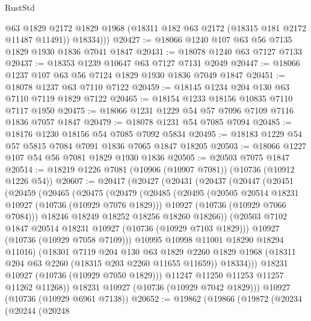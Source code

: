 \begin{lexlean}{RustStd}
\begin{coremodule}
          @63
          @1829
          @2172
          @1829
          @1968
          (@18311 @182 @63 @2172 (@18315 @181 @2172 @11487 @11491))
          @18334)))
@20427 := @18066 @1240 @107 @63 @56 @7135 @1829 @1930 @1836 @7041 @1847
@20431 := @18078 @1240 @63 @7127 @7133
@20437 := @18353 @1239 @10647 @63 @7127 @7131 @2049
@20447 := @18066 @1237 @107 @63 @56 @7124 @1829 @1930 @1836 @7049 @1847
@20451 := @18078 @1237 @63 @7110 @7122
@20459 := @18145 @1234 @204 @130 @63 @7110 @7119 @1829 @7122
@20465 := @18154 @1233 @18156 @10835 @7110 @7117 @1950
@20475 := @18066 @1231 @1229 @54 @57 @7096 @7109 @7116 @1836 @7057 @1847
@20479 := @18078 @1231 @54 @7085 @7094
@20485 := @18176 @1230 @18156 @54 @7085 @7092 @5834
@20495 := @18183 @1229 @54 @57 @5815 @7084 @7091 @1836 @7065 @1847 @18205
@20503 := @18066 @1227 @107 @54 @56 @7081 @1829 @1930 @1836
@20505 := @20503 @7075 @1847
@20514 := @18219 @1226 @7081 (@10906 (@10907 @7081)) (@10736 (@10912 @1226 @54))
@20607 := @20417
    (@20427
      (@20431
        (@20437
          (@20447
            (@20451
              (@20459
                (@20465
                  (@20475
                    (@20479
                      (@20485
                        (@20495
                          (@20505 @20514 @18231 @10927 (@10736 (@10929 @7076 @1829)))
                          @10927
                          (@10736 (@10929 @7066 @7084)))
                        @18246
                        @18249
                        @18252
                        @18256
                        @18260
                        @18266))
                    (@20503 @7102 @1847 @20514 @18231 @10927 (@10736 (@10929 @7103 @1829)))
                    @10927
                    (@10736 (@10929 @7058 @7109)))
                  @10995
                  @10998
                  @11001
                  @18290
                  @18294
                  @11016)
                (@18301
                  @7119
                  @204
                  @130
                  @63
                  @1829
                  @2260
                  @1829
                  @1968
                  (@18311 @204 @63 @2260 (@18315 @203 @2260 @11655 @11659))
                  @18334)))
            @18231
            @10927
            (@10736 (@10929 @7050 @1829)))
          @11247
          @11250
          @11253
          @11257
          @11262
          @11268))
      @18231
      @10927
      (@10736 (@10929 @7042 @1829)))
    @10927
    (@10736 (@10929 @6961 @7138))
@20652 := @19862
    (@19866
      (@19872
        (@20234
          (@20244
            (@20248

\end{coremodule}
\end{lexlean}
